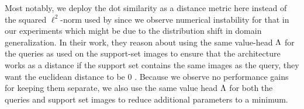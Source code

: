 Most notably, we deploy the dot similarity as a distance metric here instead of the squared $\ell^2$-norm used by \citet{DoerschGZ20} since we observe numerical instability for that in our experiments which might be due to the distribution shift in domain generalization. In their work, they reason about using the same value-head $\Lambda$ for the queries as used on the support-set images to ensure that the architecture works as a distance \ie if the support set contains the same images as the query, they want the euclidean distance to be $0$ \citep{DoerschGZ20}. Because we observe no performance gains for keeping them separate, we also use the same value head $\Lambda$ for both the queries and support set images to reduce additional parameters to a minimum.


